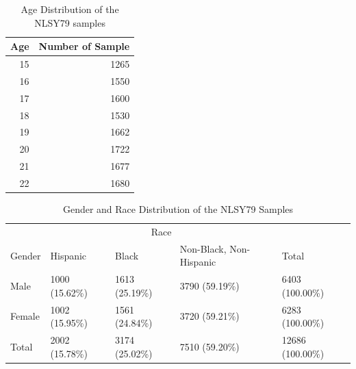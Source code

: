 \begin{Schunk}
\begin{table}

\caption{\label{tab:age-table}Age Distribution of the NLSY79 samples}
\centering
\begin{tabular}[t]{r|r}
\hline
Age & Number of Sample\\
\hline
\rowcolor{gray!6}  15 & 1265\\
\hline
16 & 1550\\
\hline
\rowcolor{gray!6}  17 & 1600\\
\hline
18 & 1530\\
\hline
\rowcolor{gray!6}  19 & 1662\\
\hline
20 & 1722\\
\hline
\rowcolor{gray!6}  21 & 1677\\
\hline
22 & 1680\\
\hline
\end{tabular}
\end{table}

\end{Schunk}

\begin{Schunk}
\begin{table}

\caption{\label{tab:gender-race-table}Gender and Race Distribution of the NLSY79 Samples}
\centering
\begin{tabular}[t]{l|l|l|l|l}
\hline
\multicolumn{1}{c|}{ } & \multicolumn{3}{c|}{Race} & \multicolumn{1}{c}{ } \\
\cline{2-4}
Gender & Hispanic & Black & Non-Black, Non-Hispanic & Total\\
\hline
\rowcolor{gray!6}  Male & 1000 (15.62\%) & 1613 (25.19\%) & 3790 (59.19\%) & 6403 (100.00\%)\\
\hline
Female & 1002 (15.95\%) & 1561 (24.84\%) & 3720 (59.21\%) & 6283 (100.00\%)\\
\hline
\rowcolor{gray!6}  Total & 2002 (15.78\%) & 3174 (25.02\%) & 7510 (59.20\%) & 12686 (100.00\%)\\
\hline
\end{tabular}
\end{table}

\end{Schunk}

